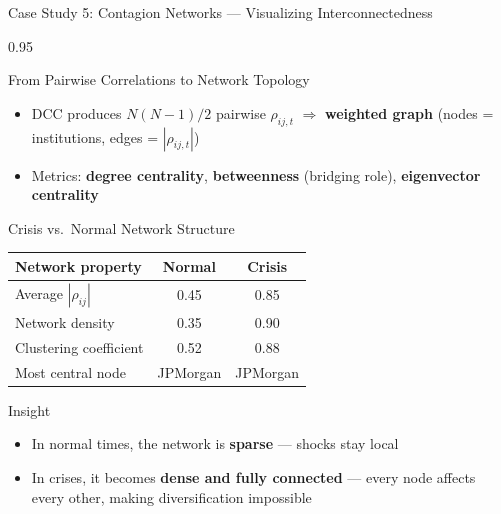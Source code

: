 \documentclass[9pt, aspectratio=169, t]{beamer}
\begin{document}
\begin{frame}{Case Study 5: Contagion Networks --- Visualizing Interconnectedness}
    \begin{cminipage}{0.95\textwidth}
    \vspace{-2mm}
    {\scriptsize
    \begin{block}{From Pairwise Correlations to Network Topology}
        \begin{itemize}\setlength{\itemsep}{0pt}
            \item DCC produces $N(N-1)/2$ pairwise $\rho_{ij,t}$ $\Rightarrow$ \textbf{weighted graph} (nodes = institutions, edges = $|\rho_{ij,t}|$)
            \item Metrics: \textbf{degree centrality}, \textbf{betweenness} (bridging role), \textbf{eigenvector centrality}
        \end{itemize}
    \end{block}
    \vspace{-3mm}
    \begin{block}{Crisis vs.\ Normal Network Structure}
        {\small
        \begin{center}
        \begin{tabular}{l|cc}
            \hline
            \textbf{Network property} & \textbf{Normal} & \textbf{Crisis} \\
            \hline
            Average $|\rho_{ij}|$    & 0.45 & 0.85 \\
            Network density          & 0.35 & 0.90 \\
            Clustering coefficient   & 0.52 & 0.88 \\
            Most central node        & JPMorgan & JPMorgan \\
            \hline
        \end{tabular}
        \end{center}
        }
    \end{block}
    \vspace{-2mm}
    \begin{alertblock}{Insight}
        \begin{itemize}\setlength{\itemsep}{0pt}
            \item In normal times, the network is \textbf{sparse} --- shocks stay local
            \item In crises, it becomes \textbf{dense and fully connected} --- every node affects every other, making diversification impossible
        \end{itemize}
    \end{alertblock}
    }
    \end{cminipage}
\end{frame}
\end{document}
